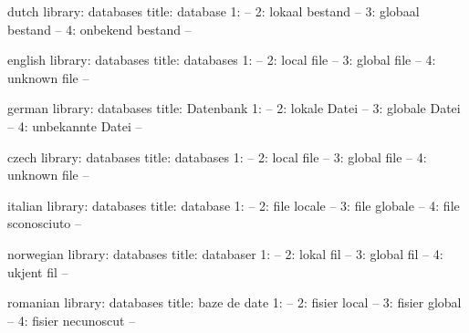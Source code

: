 

\startmessages  dutch  library: databases
  title: database
      1: --
      2: lokaal bestand --
      3: globaal bestand --
      4: onbekend bestand --
\stopmessages

\startmessages  english  library: databases
  title: databases
      1: --
      2: local file --
      3: global file --
      4: unknown file --
\stopmessages

\startmessages  german  library: databases
  title: Datenbank
      1: --
      2: lokale Datei --
      3: globale Datei --
      4: unbekannte Datei --
\stopmessages


\startmessages  czech library: databases
  title: databases
      1: --
      2: local file --
      3: global file --
      4: unknown file --
\stopmessages

\startmessages  italian  library: databases
  title: database
      1: --
      2: file locale --
      3: file globale --
      4: file sconosciuto --
\stopmessages

\startmessages  norwegian  library: databases
  title: databaser
      1: --
      2: lokal fil --
      3: global fil --
      4: ukjent fil --
\stopmessages

\startmessages  romanian  library: databases
  title: baze de date
      1: --
      2: fisier local --
      3: fisier global --
      4: fisier necunoscut --
\stopmessages

\unprotect

